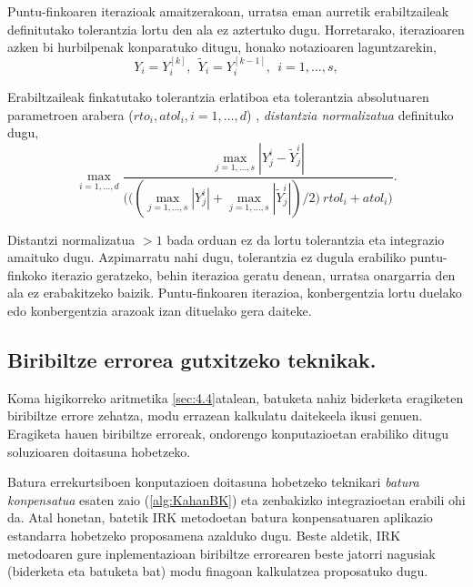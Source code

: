 Puntu-finkoaren iterazioak amaitzerakoan, urratsa eman aurretik erabiltzaileak definitutako tolerantzia lortu den ala ez aztertuko dugu. Horretarako, iterazioaren azken bi hurbilpenak konparatuko ditugu, honako notazioaren laguntzarekin,
\begin{equation*}
Y_i=Y_i^{[k]}, \ \ \tilde{Y}_i=Y_i^{[k-1]}, \ \ i=1,\dots,s,
\end{equation*}  

Erabiltzaileak finkatutako tolerantzia erlatiboa eta tolerantzia absolutuaren parametroen arabera ($rto_i,atol_i, i=1,\dots,d$) , \emph{distantzia normalizatua} definituko dugu,
\begin{equation*}
\max_{i=1,\dots,d} \frac{\max_{j=1,\dots,s} |Y_j^i-\tilde{Y}_j^i|}
                        {\bigg(\big((\max_{j=1,\dots,s} |Y_j^i|+\max_{j=1,\dots,s} |\tilde{Y}_j^i|)/2 \big) \ rtol_i+ atol_i \bigg)}.
\end{equation*}

Distantzi normalizatua $>1$ bada orduan ez da lortu tolerantzia eta integrazio amaituko dugu.
Azpimarratu nahi dugu, tolerantzia ez dugula erabiliko puntu-finkoko iterazio geratzeko, behin iterazioa geratu denean, urratsa onargarria den ala ez erabakitzeko baizik. Puntu-finkoaren iterazioa, konbergentzia lortu duelako edo konbergentzia arazoak izan dituelako gera daiteke. 

\subsection{Biribiltze errorea gutxitzeko teknikak.}

Koma higikorreko aritmetika \ref{sec:4.4}atalean, batuketa nahiz biderketa eragiketen biribiltze errore zehatza, modu errazean kalkulatu daitekeela  ikusi genuen. Eragiketa hauen biribiltze erroreak, ondorengo konputazioetan erabiliko ditugu soluzioaren doitasuna hobetzeko.

Batura errekurtsiboen konputazioen doitasuna hobetzeko teknikari \emph{batura konpensatua} esaten zaio (\ref{alg:KahanBK}) eta zenbakizko integrazioetan erabili ohi da. Atal honetan, batetik IRK metodoetan batura konpensatuaren aplikazio estandarra hobetzeko proposamena azalduko dugu. Beste aldetik, IRK metodoaren gure  inplementazioan biribiltze errorearen beste jatorri nagusiak (biderketa eta batuketa bat) modu finagoan kalkulatzea proposatuko dugu.    


